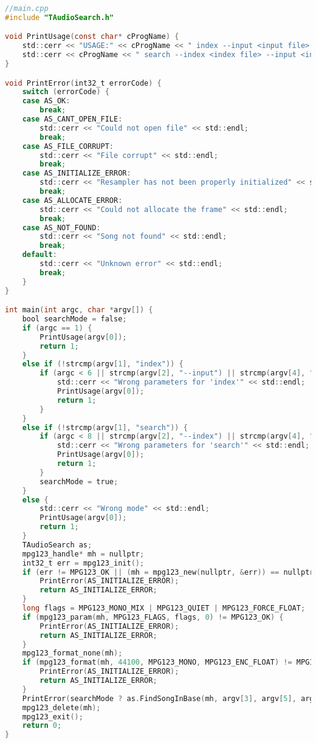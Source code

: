 \begin{lstlisting}[language=C, mathescape]
//main.cpp
#include "TAudioSearch.h"

void PrintUsage(const char* cProgName) {
    std::cerr << "USAGE:" << cProgName << " index --input <input file> --output <index file>" << std::endl;
    std::cerr << cProgName << " search --index <index file> --input <input file> --output <output file>" << std::endl;
}

void PrintError(int32_t errorCode) {
    switch (errorCode) {
    case AS_OK:
        break;
    case AS_CANT_OPEN_FILE:
        std::cerr << "Could not open file" << std::endl;
        break;
    case AS_FILE_CORRUPT:
        std::cerr << "File corrupt" << std::endl;
        break;
    case AS_INITIALIZE_ERROR:
        std::cerr << "Resampler has not been properly initialized" << std::endl;
        break;
    case AS_ALLOCATE_ERROR:
        std::cerr << "Could not allocate the frame" << std::endl;
        break;
    case AS_NOT_FOUND:
        std::cerr << "Song not found" << std::endl;
        break;
    default:
        std::cerr << "Unknown error" << std::endl;
        break;
    }
}

int main(int argc, char *argv[]) {
    bool searchMode = false;
    if (argc == 1) {
        PrintUsage(argv[0]);
        return 1;
    }
    else if (!strcmp(argv[1], "index")) {
        if (argc < 6 || strcmp(argv[2], "--input") || strcmp(argv[4], "--output")) {
            std::cerr << "Wrong parameters for 'index'" << std::endl;
            PrintUsage(argv[0]);
            return 1;
        }
    }
    else if (!strcmp(argv[1], "search")) {
        if (argc < 8 || strcmp(argv[2], "--index") || strcmp(argv[4], "--input") || strcmp(argv[6], "--output")) {
            std::cerr << "Wrong parameters for 'search'" << std::endl;
            PrintUsage(argv[0]);
            return 1;
        }
        searchMode = true;
    }
    else {
        std::cerr << "Wrong mode" << std::endl;
        PrintUsage(argv[0]);
        return 1;
    }
    TAudioSearch as;
    mpg123_handle* mh = nullptr;
    int32_t err = mpg123_init();
    if (err != MPG123_OK || (mh = mpg123_new(nullptr, &err)) == nullptr){
        PrintError(AS_INITIALIZE_ERROR);
        return AS_INITIALIZE_ERROR;
    }
    long flags = MPG123_MONO_MIX | MPG123_QUIET | MPG123_FORCE_FLOAT;
    if (mpg123_param(mh, MPG123_FLAGS, flags, 0) != MPG123_OK) {
        PrintError(AS_INITIALIZE_ERROR);
        return AS_INITIALIZE_ERROR;
    }
    mpg123_format_none(mh);
    if (mpg123_format(mh, 44100, MPG123_MONO, MPG123_ENC_FLOAT) != MPG123_OK) {
        PrintError(AS_INITIALIZE_ERROR);
        return AS_INITIALIZE_ERROR;
    }
    PrintError(searchMode ? as.FindSongInBase(mh, argv[3], argv[5], argv[7]) : as.CreateMusicBase(mh, argv[3], argv[5]));
    mpg123_delete(mh);
    mpg123_exit();
    return 0;
}
\end{lstlisting}
